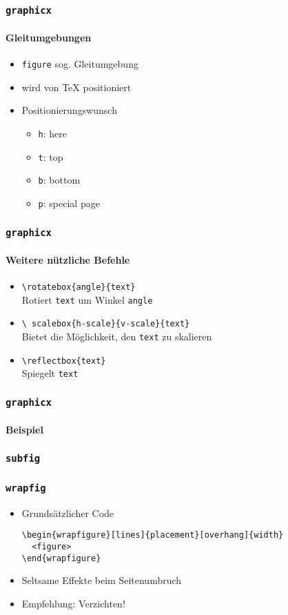 \begin{frame}
  \frametitle{\texttt{graphicx}}
  \framesubtitle{Gleitumgebungen}
  \begin{itemize}
  \item \texttt{figure} sog. Gleitumgebung
  \item wird von \TeX{} positioniert
  \item Positionierungswunsch
    \begin{itemize}
    \item \texttt{h}: here
    \item \texttt{t}: top
    \item \texttt{b}: bottom
    \item \texttt{p}: special page
    \end{itemize}
  \end{itemize}
\end{frame}

\begin{frame}
  \frametitle{\texttt{graphicx}}
  \framesubtitle{Weitere nützliche Befehle}
  \begin{itemize}
  \item \texttt{\textbackslash rotatebox\{angle\}\{text\}}\\
    Rotiert \texttt{text} um Winkel \texttt{angle}
  \item \texttt{\textbackslash
      scalebox\{h-scale\}\{v-scale\}\{text\}}\\
    Bietet die Möglichkeit, den \texttt{text} zu skalieren
  \item \texttt{\textbackslash reflectbox\{text\}}\\
    Spiegelt \texttt{text}
  \end{itemize}
\end{frame}

\begin{frame}
  \frametitle{\texttt{graphicx}}
  \framesubtitle{Beispiel}
\end{frame}

\begin{frame}
  \frametitle{\texttt{subfig}}
  
\end{frame}

\begin{frame}[fragile]
  \frametitle{\texttt{wrapfig}}
  \begin{itemize}
  \item Grundsätzlicher Code
\begin{lstlisting}[language={[LaTeX]TeX}]
\begin{wrapfigure}[lines]{placement}[overhang]{width}
  <figure>
\end{wrapfigure}
\end{lstlisting}
  \item Seltsame Effekte beim Seitenumbruch
  \item Empfehlung: Verzichten!
  \end{itemize}
\end{frame}

